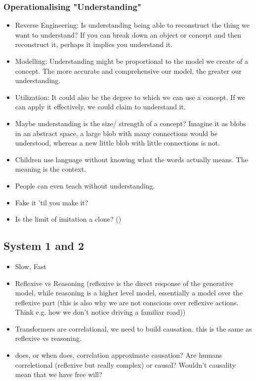 \subsubsection{Operationalising "Understanding"}
\begin{itemize}
    \item Reverse Engineering: Is understanding being able to reconstruct the thing we want to understand? If you can break down an object or concept and then reconstruct it, perhaps it implies you understand it.
    \item Modelling: Understanding might be proportional to the model we create of a concept. The more accurate and comprehensive our model, the greater our understanding.
    \item Utilization: It could also be the degree to which we can use a concept. If we can apply it effectively, we could claim to understand it.
    \item Maybe understanding is the size/ strength of a concept? Imagine it as blobs in an abstract space, a large blob with many connections would be understood, whereas a new little blob with little connections is not. 
\end{itemize}

\begin{itemize}
    \item Children use language without knowing what the words actually means. The meaning is the context. 
    \item People can even teach without understanding. 
    \item Fake it 'til you make it?
    \item Is the limit of imitation a clone? ()
\end{itemize}

\subsection{System 1 and 2}

\begin{itemize}
    \item Slow, Fast
    \item Reflexive vs Reasoning (reflexive is the direct response of the generative model, while reasoning is a higher level model, essentially a model over the reflexive part (this is also why we are not conscious over reflexive actions. Think e.g. how we don't notice driving a familiar road))
    \item Transformers are correlational, we need to build causation. this is the same as reflexive vs reasoning.
    \item does, or when does, correlation approximate causation? Are humans correletional (reflexive but really complex) or causal? Wouldn't causality mean that we have free will?
\end{itemize}

